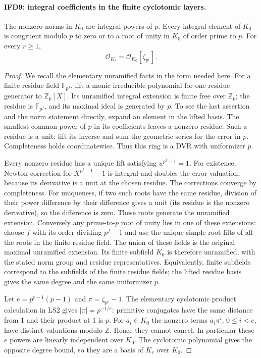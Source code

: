 \paragraph{IFD9: integral coefficients in the finite cyclotomic layers.}
\label{claim:IFD9}
The nonzero norms in $K_0$ are integral powers of $p$.
Every integral element of $K_0$ is congruent modulo $p$ to zero or
to a root of unity in $K_0$ of order prime to $p$.
For every $r\geq1$,
\[
                 \mathcal O_{K_r}=\mathcal O_{K_0}[\zeta_{p^r}].
                                                               \tag{IFD.17}
\]

\begin{proof}
We recall the elementary unramified facts in the form needed here.
For a finite residue field $\mathbb F_{p^f}$, lift a monic
irreducible polynomial for one residue generator to $\mathbb Z_p[X]$.
Its unramified integral extension is finite free over $\mathbb Z_p$;
the residue is $\mathbb F_{p^f}$, and its maximal ideal is generated
by $p$. To see the last assertion and the norm statement directly,
expand an element in the lifted basis. The smallest common power
of $p$ in its coefficients leaves a nonzero residue. Such a residue
is a unit: lift its inverse and sum the geometric series for the
error in $p$. Completeness holds coordinatewise. Thus this ring is
a DVR with uniformizer $p$.

Every nonzero residue has a unique lift satisfying $u^{p^f-1}=1$.
For existence, Newton correction for $X^{p^f-1}-1$ is integral
and doubles the error valuation, because its derivative is a unit
at the chosen residue. The corrections converge by completeness.
For uniqueness, if two such roots have the same residue, division
of their power difference by their difference gives a unit
(its residue is the nonzero derivative), so the difference is zero.
These roots generate the unramified extension. Conversely any
prime-to-$p$ root of unity lies in one of these extensions: choose
$f$ with its order dividing $p^f-1$ and use the unique simple-root
lifts of all the roots in the finite residue field. The union of
these fields is the original maximal unramified extension.
Its finite subfield $K_0$ is therefore unramified, with the stated
norm group and residue representatives. Equivalently, finite
subfields correspond to the subfields of the finite residue fields;
the lifted residue basis gives the same degree and the same
uniformizer $p$.

Let $e=p^{r-1}(p-1)$ and $\pi=\zeta_{p^r}-1$.
The elementary cyclotomic product calculation in LS2 gives
$|\pi|=p^{-1/e}$: primitive conjugates have the same distance from
$1$ and their product at $1$ is $p$. For $a_i\in K_0$ the nonzero
terms $a_i\pi^i$, $0\leq i<e$, have distinct valuations modulo
$\mathbb Z$. Hence they cannot cancel. In particular these $e$
powers are linearly independent over $K_0$. The cyclotomic
polynomial gives the opposite degree bound, so they are a basis
of $K_r$ over $K_0$.


\end{proof}
